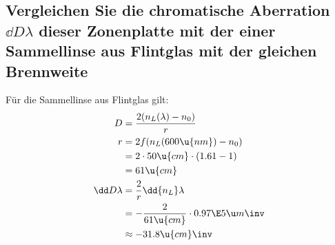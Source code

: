 \documentclass[ex]{exercise}
\begin{document}
\subsection{Vergleichen Sie die chromatische Aberration \(\dd D\lambda\)
dieser Zonenplatte mit der einer Sammellinse aus Flintglas mit
der gleichen Brennweite}

\dottedlinett

Für die Sammellinse aus Flintglas gilt:
\begin{align*}
    D &= \frac{2(n_L(\lambda) - n_0)}{r}\\
    r &= 2f (n_L(600\u{nm}) - n_0)\\
    &= 2\cdot 50\u{cm} \cdot (1.61 - 1)\\
    &= 61 \u{cm}\\
    \dd D\lambda &= \frac{2}{r} \dd{n_L}\lambda\\
    &= - \frac{2}{61 \u{cm}} \cdot 0.97\E5 \u m\inv\\
    &\approx - 31.8 \u{cm}\inv\\
\end{align*}
\end{document}

